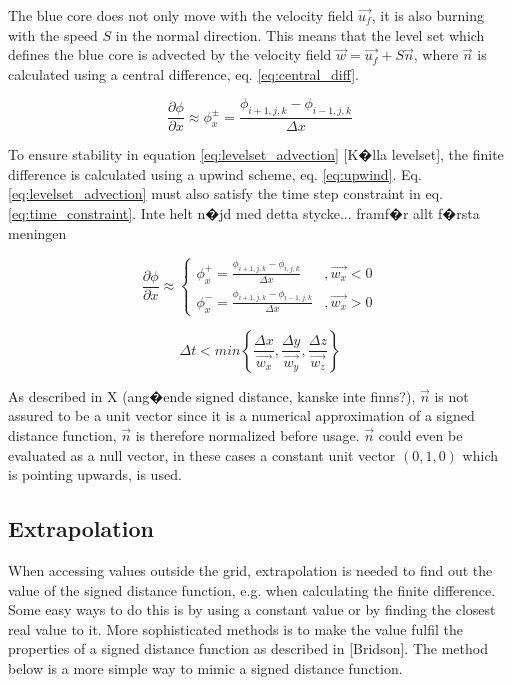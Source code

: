 The blue core does not only move with the velocity field $\vec{u_f}$, it is also burning with the speed $S$ in the normal direction. This means that the level set which defines the blue core is advected by the velocity field $\vec{w} = \vec{u_f} + S \vec{n}$, where $\vec{n}$ is calculated using a central difference, eq. \ref{eq:central_diff}.

\begin{equation}
\label{eq:central_diff}
\frac{\partial \phi}{\partial x} \approx \phi_x^\pm = \frac{\phi_{i+1,j,k} - \phi_{i-1,j,k}}{\Delta x }
\end{equation}  

To ensure stability in equation \ref{eq:levelset_advection} [K�lla levelset], the finite difference is calculated using a upwind scheme, eq. \ref{eq:upwind}. Eq. \ref{eq:levelset_advection} must also satisfy the time step constraint in eq. \ref{eq:time_constraint}. Inte helt n�jd med detta stycke... framf�r allt f�rsta meningen

\begin{equation}
\label{eq:upwind}
\frac{\partial \phi}{\partial x} \approx \left\{\begin{matrix}
 \phi_x^+ = \frac{\phi_{i+1,j,k} - \phi_{i,j,k}}{\Delta x } & ,\vec{w_x} < 0
\\ 
 \phi_x^- = \frac{\phi_{i+1,j,k} - \phi_{i-1,j,k}}{\Delta x } & ,\vec{w_x} > 0 
\end{matrix}\right.
\end{equation}  

\begin{equation}
\label{eq:time_constraint}
\Delta t < min \left \{ \frac{\Delta x}{ \vec{w_x} }, \frac{\Delta y}{ \vec{w_y} }, \frac{\Delta z}{ \vec{w_z} } \right \}
\end{equation} 

As described in X (ang�ende signed distance, kanske inte finns?), $\vec{n}$ is not assured to be a unit vector since it is a numerical approximation of a signed distance function, $\vec{n}$ is therefore normalized before usage. $\vec{n}$ could even be evaluated as a null vector, in these cases a constant unit vector $(0, 1, 0)$ which is pointing upwards, is used.

\subsection{Extrapolation}

When accessing values outside the grid, extrapolation is needed to find out the value of the signed distance function, e.g. when calculating the finite difference. Some easy ways to do this is by using a constant value or by finding the closest real value to it. More sophisticated methods is to make the value fulfil the properties of a signed distance function as described in [Bridson]. The method below is a more simple way to mimic a signed distance function. 

